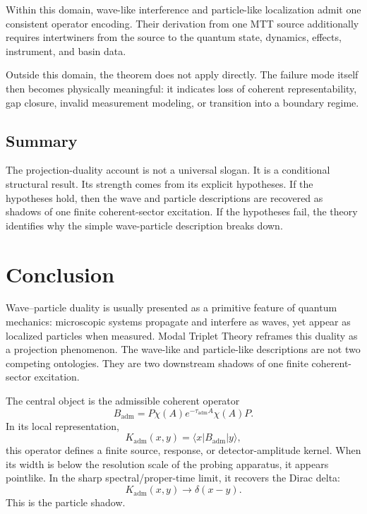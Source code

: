 \documentclass[11pt]{article}
\newcommand{\Kadm}{K_{\mathrm{adm}}}
\newcommand{\Badm}{B_{\mathrm{adm}}}
\newcommand{\ta}{\tau_{\mathrm{adm}}}
\begin{document}
Within this domain, wave-like interference and particle-like localization admit one consistent
operator encoding. Their derivation from one MTT source additionally requires intertwiners
from the source to the quantum state, dynamics, effects, instrument, and basin data.

Outside this domain, the theorem does not apply directly. The failure mode itself then becomes
physically meaningful: it indicates loss of coherent representability, gap closure, invalid
measurement modeling, or transition into a boundary regime.

\subsection{Summary}
\label{subsec:failure-summary}

The projection-duality account is not a universal slogan. It is a conditional structural result.
Its strength comes from its explicit hypotheses. If the hypotheses hold, then the wave and
particle descriptions are recovered as shadows of one finite coherent-sector excitation. If the
hypotheses fail, the theory identifies why the simple wave-particle description breaks down.

\begin{center}
\end{center}
\section{Conclusion}
\label{sec:conclusion}

Wave--particle duality is usually presented as a primitive feature of quantum mechanics:
microscopic systems propagate and interfere as waves, yet appear as localized particles when
measured. Modal Triplet Theory reframes this duality as a projection phenomenon. The
wave-like and particle-like descriptions are not two competing ontologies. They are two
downstream shadows of one finite coherent-sector excitation.

The central object is the admissible coherent operator
\begin{equation}
  \Badm
  =
  P\chi(A)e^{-\ta A}\chi(A)P.
\end{equation}
In its local representation,
\begin{equation}
  \Kadm(x,y)=\langle x|\Badm|y\rangle,
\end{equation}
this operator defines a finite source, response, or detector-amplitude kernel. When its width
is below the resolution scale of the probing apparatus, it appears pointlike. In the sharp
spectral/proper-time limit, it recovers the Dirac delta:
\begin{equation}
  \Kadm(x,y)\longrightarrow\delta(x-y).
\end{equation}
This is the particle shadow.
\end{document}
